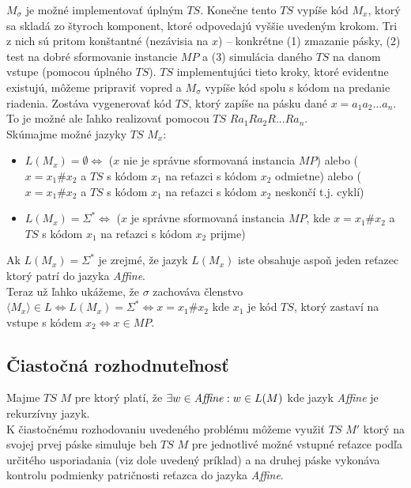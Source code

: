 \documentclass[11pt,a4paper]{article}
\begin{document}
$M_{\sigma}$ je možné implementovať úplným $TS$. Konečne tento $TS$ vypíše kód $M_x$, ktorý sa skladá zo štyroch komponent, ktoré odpovedajú vyššie uvedeným krokom. Tri z nich sú pritom konštantné (nezávisia na $x$) -- konkrétne (1) zmazanie pásky, (2) test na dobré sformovanie instancie $MP$ a (3) simulácia daného $TS$ na danom vstupe (pomocou úplného $TS$). $TS$ implementujúci tieto kroky, ktoré evidentne existujú, môžeme pripraviť vopred a $M_{\sigma}$ vypíše kód spolu s kódom na predanie riadenia. Zostáva vygenerovať kód $TS$, ktorý zapíše na pásku dané $x = a_1a_2...a_n$. To je možné ale ľahko realizovať pomocou $TS$ $Ra_1Ra_2R...Ra_n$. \\

Skúmajme možné jazyky $TS$ $M_x$:

\begin{itemize}
    \item $L(M_x) = \emptyset \Longleftrightarrow $ ($x$ nie je správne sformovaná instancia $MP$) alebo ($x=x_1\#x_2$ a $TS$ s kódom $x_1$ na reťazci s kódom $x_2$ odmietne) alebo ($x=x_1\#x_2$ a $TS$ s kódom $x_1$ na reťazci s kódom $x_2$ neskončí t.j. cyklí)
    \item $L(M_x) = \Sigma^* \Longleftrightarrow $ ($x$ je správne sformovaná instancia $MP$, kde $x=x_1\#x_2$ a $TS$ s kódom $x_1$ na reťazci s kódom $x_2$ prijme)
\end{itemize}

Ak $L(M_x) = \Sigma^*$ je zrejmé, že jazyk $L(M_x)$ iste obsahuje aspoň jeden reťazec ktorý patrí do jazyka \textit{Affine}.\\

Teraz už ľahko ukážeme, že $\sigma$ zachováva členstvo $\langle M_{x} \rangle \in L \Leftrightarrow L(M_x) = \Sigma^{*} \Leftrightarrow x=x_1\#x_2$ kde $x_1$ je kód $TS$, ktorý zastaví na vstupe s kódem $x_2 \Leftrightarrow x \in MP$.

\newpage
\subsection{Čiastočná rozhodnuteľnosť}

Majme $TS$ $M$ pre ktorý platí, že $\exists w \in \text{\textit{Affine}}: w \in L(M)$ kde jazyk \textit{Affine} je rekurzívny jazyk.\\

K čiastočnému rozhodovaniu uvedeného problému môžeme využiť $TS$ $M'$ ktorý na svojej prvej páske simuluje beh $TS$ $M$ pre jednotlivé možné vstupné reťazce podľa určitého usporiadania (viz dole uvedený príklad) a na druhej páske vykonáva kontrolu podmienky patričnosti reťazca do jazyka \textit{Affine}.
\end{document}
